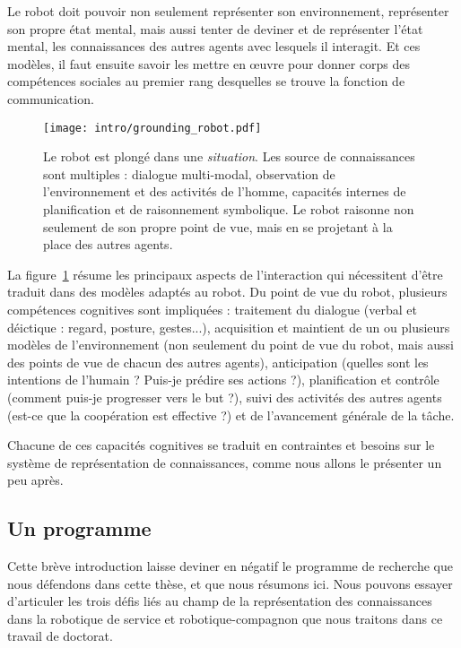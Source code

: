Le robot doit pouvoir non seulement représenter son environnement, représenter
son propre état mental, mais aussi tenter de deviner et de représenter l'état
mental, les connaissances des autres agents avec lesquels il interagit. Et ces
modèles, il faut ensuite savoir les mettre en \oe uvre pour donner corps  des
compétences sociales au premier rang desquelles se trouve la fonction de
communication.

\begin{figure}
    \centering
    \texttt{[image: intro/grounding\_robot.pdf]}
    
    \caption{Le robot est plongé dans une \emph{situation}. Les source de
    connaissances sont multiples : dialogue multi-modal, observation de
    l'environnement et des activités de l'homme, capacités internes de planification
    et de raisonnement symbolique. Le robot raisonne non seulement de son propre
    point de vue, mais en se projetant à la place des autres agents.}

    \label{fig|hri-dec}
\end{figure}

La figure~\ref{fig|hri-dec} résume les principaux aspects de l'interaction qui
nécessitent d'être traduit dans des modèles adaptés au robot. Du point de vue
du robot, plusieurs compétences cognitives sont impliquées : traitement du
dialogue (verbal et déictique : regard, posture, gestes...), acquisition et
maintient de un ou plusieurs modèles de l'environnement (non seulement du point
de vue du robot, mais aussi des points de vue de chacun des autres agents),
anticipation (quelles sont les intentions de l'humain ? Puis-je prédire ses
actions ?), planification et contrôle (comment puis-je progresser vers le but
?), suivi des activités des autres agents (est-ce que la coopération est
effective ?) et de l'avancement générale de la tâche.

Chacune de ces capacités cognitives se traduit en contraintes et besoins sur le
système de représentation de connaissances, comme nous allons le présenter
un peu après.



\subsection{Un programme}
\label{sect|challenges}

Cette brève introduction laisse deviner en négatif le programme de recherche que nous
défendons dans cette thèse, et que nous résumons ici. Nous pouvons essayer
d'articuler les trois défis liés au champ de la représentation des
connaissances dans la robotique de service et robotique-compagnon que nous
traitons dans ce travail de doctorat.

